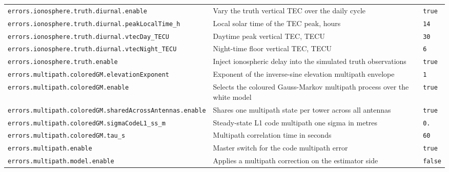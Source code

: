 \begin{center}
\begin{longtable}{>{\raggedright\arraybackslash\scriptsize\ttfamily}p{}|>{\raggedright\arraybackslash}p{}|>{\raggedright\arraybackslash\scriptsize\ttfamily}p{}}
\texttt{errors.\allowbreak ionosphere.\allowbreak truth.\allowbreak diurnal.\allowbreak enable} & Vary the truth vertical TEC over the daily cycle & \texttt{true} \\
\texttt{errors.\allowbreak ionosphere.\allowbreak truth.\allowbreak diurnal.\allowbreak peak\allowbreak Local\allowbreak Time\_\allowbreak h} & Local solar time of the TEC peak, hours & \texttt{14} \\
\texttt{errors.\allowbreak ionosphere.\allowbreak truth.\allowbreak diurnal.\allowbreak vtec\allowbreak Day\_\allowbreak TECU} & Daytime peak vertical TEC, TECU & \texttt{30} \\
\texttt{errors.\allowbreak ionosphere.\allowbreak truth.\allowbreak diurnal.\allowbreak vtec\allowbreak Night\_\allowbreak TECU} & Night-time floor vertical TEC, TECU & \texttt{6} \\
\texttt{errors.\allowbreak ionosphere.\allowbreak truth.\allowbreak enable} & Inject ionospheric delay into the simulated truth observations & \texttt{true} \\
\texttt{errors.\allowbreak multipath.\allowbreak colored\allowbreak GM.\allowbreak elevation\allowbreak Exponent} & Exponent of the inverse-sine elevation multipath envelope & \texttt{1} \\
\texttt{errors.\allowbreak multipath.\allowbreak colored\allowbreak GM.\allowbreak enable} & Selects the coloured Gauss-Markov multipath process over the white model & \texttt{true} \\
\texttt{errors.\allowbreak multipath.\allowbreak colored\allowbreak GM.\allowbreak shared\allowbreak Across\allowbreak Antennas.\allowbreak enable} & Shares one multipath state per tower across all antennas & \texttt{true} \\
\texttt{errors.\allowbreak multipath.\allowbreak colored\allowbreak GM.\allowbreak sigma\allowbreak Code\allowbreak L1\_\allowbreak ss\_\allowbreak m} & Steady-state L1 code multipath one sigma in metres & \texttt{0.\allowbreak 3} \\
\texttt{errors.\allowbreak multipath.\allowbreak colored\allowbreak GM.\allowbreak tau\_\allowbreak s} & Multipath correlation time in seconds & \texttt{60} \\
\texttt{errors.\allowbreak multipath.\allowbreak enable} & Master switch for the code multipath error & \texttt{true} \\
\texttt{errors.\allowbreak multipath.\allowbreak model.\allowbreak enable} & Applies a multipath correction on the estimator side & \texttt{false} \\

\end{longtable}
\end{center}

